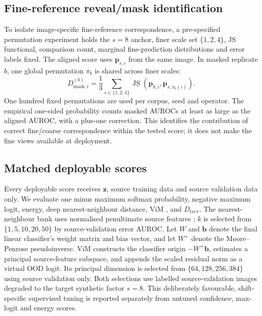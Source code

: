 \subsection{Fine-reference reveal/mask identification}

To isolate image-specific fine-reference correspondence, a pre-specified
permutation experiment holds the \(s=8\) anchor, finer scale set
\(\{1,2,4\}\), JS functional, comparison count, marginal fine-prediction
distributions and error labels fixed. The aligned score uses
\(\boldsymbol{p}_{s,i}\) from the same image. In masked replicate \(b\), one
global permutation \(\pi_b\) is shared across finer scales:
\begin{equation}
D_{\mathrm{mask},i}^{(b)} =
\frac{1}{3}\sum_{s\in\{1,2,4\}}
\operatorname{JS}\!\left(
\boldsymbol{p}_{8,i},
\boldsymbol{p}_{s,\pi_b(i)}
\right).
\end{equation}
One hundred fixed permutations are used per corpus, seed and operator. The
empirical one-sided probability counts masked AUROCs at least as large as the
aligned AUROC, with a plus-one correction. This identifies the contribution of
correct fine/coarse correspondence within the tested score; it does not make
the fine views available at deployment.

\subsection{Matched deployable scores}

Every deployable score receives \(\mathbf{z}\), source training data and source
validation data only. We evaluate one minus maximum softmax probability,
negative maximum logit, energy, deep nearest-neighbour distance, ViM
\citep{wang2022vim}, and \(D_{\mathrm{recv}}\). The nearest-neighbour bank uses
normalised penultimate source features \citep{sun2022knn}; \(k\) is selected
from \(\{1,5,10,20,50\}\) by source-validation error AUROC. Let \(W\) and
\(\mathbf{b}\) denote the final linear classifier's weight matrix and bias
vector, and let \(W^{+}\) denote the Moore--Penrose pseudoinverse. ViM
constructs the classifier origin \(-W^{+}\mathbf{b}\), estimates a principal
source-feature subspace, and appends the scaled residual norm as a virtual OOD
logit. Its principal dimension is selected from
\(\{64,128,256,384\}\) using source validation only.
Both selections use labelled source-validation images degraded to the target
synthetic factor \(s=8\). This deliberately favourable, shift-specific
supervised tuning is reported separately from untuned confidence, max-logit and
energy scores.

